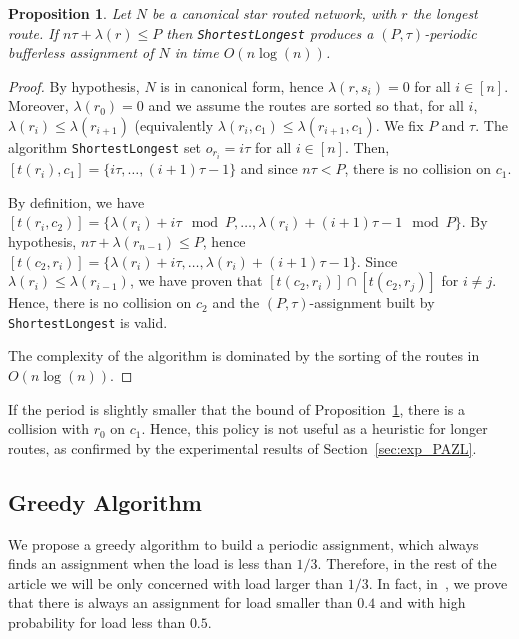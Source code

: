 \documentclass[a4paper,10pt]{article}
\newcommand\shortestlongest{\texttt{ShortestLongest}\xspace}
\newtheorem{proposition}{Proposition}
\begin{document}
      \begin{proposition} Let $N$ be a canonical star routed network, with $r$ the longest route. If $n\tau + \lambda(r) \leq P$ then \shortestlongest produces a $(P,\tau)$-periodic bufferless assignment of $N$ in time $O(n\log(n))$.\label{prop:SL}
      \end{proposition}
      \begin{proof}
       By hypothesis, $N$ is in canonical form, hence $\lambda(r,s_i) = 0$ for all $i \in [n]$. Moreover, $\lambda(r_0) = 0$ and we assume the routes are sorted so that, for all $i$, $\lambda(r_i) \leq \lambda(r_{i+1})$ (equivalently $\lambda(r_i,c_1) \leq \lambda(r_{i+1},c_1)$. We fix $P$ and $\tau$. The algorithm \shortestlongest set $o_{r_i} = i\tau$ for all $i \in [n]$. Then, $[t(r_{i}),c_1] = \{i\tau,\dots, (i+1)\tau -1\}$ and since $n\tau < P$, there is no collision on $c_1$. 

       By definition, we have  $[t(r_{i},c_2)] = \{\lambda(r_{i}) + i\tau \mod P, \dots, \lambda(r_{i}) + (i+1)\tau -1 \mod P\}$. By hypothesis, $n\tau + \lambda(r_{n-1}) \leq P$, hence $[t(c_2,r_{i})] = \{\lambda(r_{i}) + i\tau, \dots, \lambda(r_{i}) + (i+1)\tau -1\}$. Since  $\lambda(r_i) \leq \lambda(r_{i-1})$, we have proven that $[t(c_2,r_{i})] \cap [t(c_2,r_{j})]$ for $i \neq j$. Hence, there is no collision on $c_2$ and the $(P,\tau)$-assignment built by \shortestlongest is valid.

 		The complexity of the algorithm is dominated by the sorting of the routes in $O(n\log(n))$. 
      \end{proof}

      If the period is slightly smaller that the bound of Proposition~\ref{prop:SL}, there is a collision with $r_0$ on $c_1$. Hence, this policy is not useful as a heuristic for longer routes, as confirmed by the experimental results of Section~\ref{sec:exp_PAZL}. 

   
    \subsection{Greedy Algorithm}
    

     We propose a greedy algorithm to build a periodic assignment, which always finds an assignment when the load is less than $1/3$. Therefore, in the rest of the article we will be only concerned with load larger than $1/3$. In fact, in~\cite{guiraud2020scheduling}, we prove that there is always an assignment for load smaller than $0.4$ and with high probability for load less than $0.5$.
\end{document}

